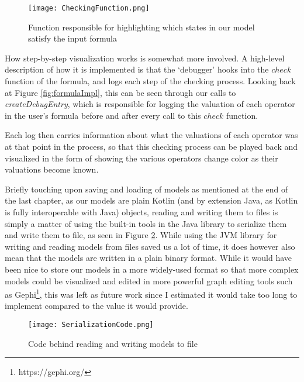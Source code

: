 \begin{figure}[h]
	\texttt{[image: CheckingFunction.png]}
	\caption{Function responsible for highlighting which states in our model satisfy the input formula}
	\label{fig:CheckingFunction}
\end{figure}

How step-by-step visualization works is somewhat more involved. A high-level description of how it is implemented is that the `debugger' hooks into the $check$ function of the formula, and logs each step of the checking process. Looking back at Figure \ref{fig:formulaImpl}, this can be seen through our calls to \textit{createDebugEntry}, which is responsible for logging the valuation of each operator in the user's formula before and after every call to this $check$ function.

Each log then carries information about what the valuations of each operator was at that point in the process, so that this checking process can be played back and visualized in the form of showing the various operators change color as their valuations become known. 

Briefly touching upon saving and loading of models as mentioned at the end of the last chapter, as our models are plain Kotlin (and by extension Java, as Kotlin is fully interoperable with Java) objects, reading and writing them to files is simply a matter of using the built-in tools in the Java library to serialize them and write them to file, as seen in Figure \ref{fig:serialization}. While using the JVM library for writing and reading models from files saved us a lot of time, it does however also mean that the models are written in a plain binary format. While it would have been nice to store our models in a more widely-used format so that more complex models could be visualized and edited in more powerful graph editing tools such as Gephi\footnote{https://gephi.org/}, this was left as future work since I estimated it would take too long to implement compared to the value it would provide.

\begin{figure}
\texttt{[image: SerializationCode.png]}
\caption{Code behind reading and writing models to file}
\label{fig:serialization}
\end{figure}





